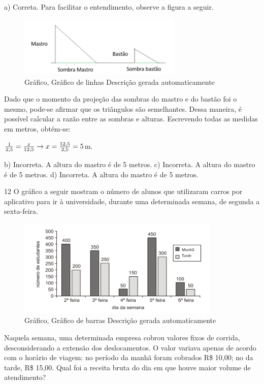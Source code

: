 {{{\begin{escolha}
{{{{{\begin{escolha}
\begin{escolha}
{\begin{q°}
{{a) Correta. Para facilitar o entendimento, observe a figura a seguir.

\begin{figure}
\centering
\includegraphics[width=3.06771in,height=1.1397in]{./_SAEB_9_MAT/media/image257.png}
\caption{Gráfico, Gráfico de linhas Descrição gerada automaticamente}
\end{figure}


Dado que o momento da projeção das sombras do mastro e do bastão foi o
mesmo, pode-se afirmar que os triângulos são semelhantes. Dessa maneira, 
é possível calcular a razão entre as sombras e alturas.
Escrevendo todas as medidas em metros, obtém-se:

$\frac{1}{2,5} = \frac{x}{12,5} \rightarrow \\
x = \frac{12,5}{2,5} = 5$m.

b) Incorreta. A altura do mastro é de 5 metros.
c) Incorreta. A altura do mastro é de 5 metros.
d) Incorreta. A altura do mastro é de 5 metros.}

\num{12} O gráfico a seguir mostram o número de alunos que utilizaram
carros por aplicativo para ir à universidade, durante uma determinada
semana, de segunda a sexta-feira.

\begin{figure}
\centering
\includegraphics[width=3.79687in,height=1.84263in]{./_SAEB_9_MAT/media/image258.png}
\caption{Gráfico, Gráfico de barras Descrição gerada automaticamente}
\end{figure}

Naquela semana, uma determinada empresa cobrou valores fixos de corrida,
desconsiderando a extensão dos deslocamentos. O valor variava apenas de 
acordo com o horário de viagem: no período da manhã foram cobrados 
R\$ 10,00; no da tarde, R\$ 15,00. Qual foi a receita bruta do dia 
em que houve maior volume de atendimento?

}
\end{q°}}
\end{escolha}
\end{escolha}}}}}}
\end{escolha}}}}
